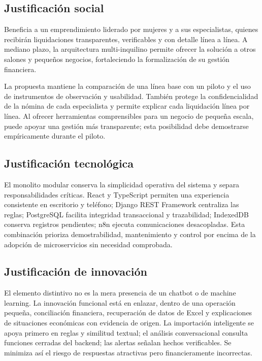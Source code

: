 \subsection{Justificación social}

Beneficia a un emprendimiento liderado por mujeres y a sus especialistas, quienes recibirán liquidaciones transparentes, verificables y con detalle línea a línea. A mediano plazo, la arquitectura multi-inquilino permite ofrecer la solución a otros salones y pequeños negocios, fortaleciendo la formalización de su gestión financiera.


La propuesta mantiene la comparación de una línea base con un piloto y el uso de instrumentos de observación y usabilidad. También protege la confidencialidad de la nómina de cada especialista y permite explicar cada liquidación línea por línea. Al ofrecer herramientas comprensibles para un negocio de pequeña escala, puede apoyar una gestión más transparente; esta posibilidad debe demostrarse empíricamente durante el piloto.


\subsection{Justificación tecnológica}

El monolito modular conserva la simplicidad operativa del sistema y separa responsabilidades críticas. React y TypeScript permiten una experiencia consistente en escritorio y teléfono; Django REST Framework centraliza las reglas; PostgreSQL facilita integridad transaccional y trazabilidad; IndexedDB conserva registros pendientes; n8n ejecuta comunicaciones desacopladas. Esta combinación prioriza demostrabilidad, mantenimiento y control por encima de la adopción de microservicios sin necesidad comprobada.


\subsection{Justificación de innovación}

El elemento distintivo no es la mera presencia de un chatbot o de machine learning. La innovación funcional está en enlazar, dentro de una operación pequeña, conciliación financiera, recuperación de datos de Excel y explicaciones de situaciones económicas con evidencia de origen. La importación inteligente se apoya primero en reglas y similitud textual; el análisis conversacional consulta funciones cerradas del backend; las alertas señalan hechos verificables. Se minimiza así el riesgo de respuestas atractivas pero financieramente incorrectas.

